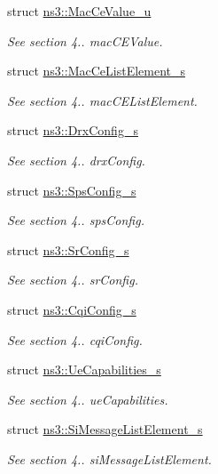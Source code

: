 \begin{DoxyCompactItemize}
struct \hyperlink{structns3_1_1MacCeValue__u}{ns3\+::\+Mac\+Ce\+Value\+\_\+u}
\begin{DoxyCompactList}\small\item\em See section 4.. mac\+C\+E\+Value. \end{DoxyCompactList}\item 
struct \hyperlink{structns3_1_1MacCeListElement__s}{ns3\+::\+Mac\+Ce\+List\+Element\+\_\+s}
\begin{DoxyCompactList}\small\item\em See section 4.. mac\+C\+E\+List\+Element. \end{DoxyCompactList}\item 
struct \hyperlink{structns3_1_1DrxConfig__s}{ns3\+::\+Drx\+Config\+\_\+s}
\begin{DoxyCompactList}\small\item\em See section 4.. drx\+Config. \end{DoxyCompactList}\item 
struct \hyperlink{structns3_1_1SpsConfig__s}{ns3\+::\+Sps\+Config\+\_\+s}
\begin{DoxyCompactList}\small\item\em See section 4.. sps\+Config. \end{DoxyCompactList}\item 
struct \hyperlink{structns3_1_1SrConfig__s}{ns3\+::\+Sr\+Config\+\_\+s}
\begin{DoxyCompactList}\small\item\em See section 4.. sr\+Config. \end{DoxyCompactList}\item 
struct \hyperlink{structns3_1_1CqiConfig__s}{ns3\+::\+Cqi\+Config\+\_\+s}
\begin{DoxyCompactList}\small\item\em See section 4.. cqi\+Config. \end{DoxyCompactList}\item 
struct \hyperlink{structns3_1_1UeCapabilities__s}{ns3\+::\+Ue\+Capabilities\+\_\+s}
\begin{DoxyCompactList}\small\item\em See section 4.. ue\+Capabilities. \end{DoxyCompactList}\item 
struct \hyperlink{structns3_1_1SiMessageListElement__s}{ns3\+::\+Si\+Message\+List\+Element\+\_\+s}
\begin{DoxyCompactList}\small\item\em See section 4.. si\+Message\+List\+Element. \end{DoxyCompactList}\item 

\end{DoxyCompactItemize}
